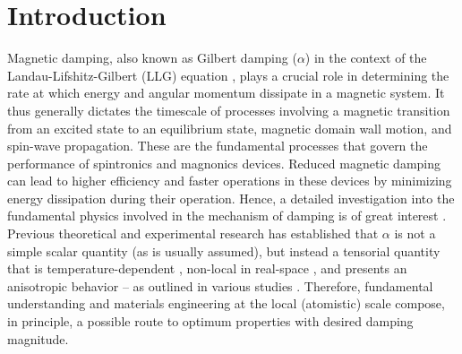 \section{Introduction}

Magnetic damping, also known as Gilbert damping ($\alpha$) in the context of the Landau-Lifshitz-Gilbert (LLG) equation \cite{eriksson2017atomistic}, plays a crucial role in determining the rate at which energy and angular momentum dissipate in a magnetic system. It thus generally dictates the timescale of processes involving a magnetic transition from an excited state to an equilibrium state, magnetic domain wall motion, and spin-wave propagation. These are the fundamental processes that govern the performance of spintronics \cite{chumak2015magnon} and magnonics \cite{barman20212021} devices. Reduced magnetic damping can lead to higher efficiency and faster operations in these devices by minimizing energy dissipation during their operation. Hence, a detailed investigation into the fundamental physics involved in the mechanism of damping is of great interest \cite{schoen2016ultra, jungwirth2016antiferromagnetic, chumak2015magnon, yang2022two}. 
Previous theoretical and experimental research has established that $\alpha$ is not a simple scalar quantity (as is usually assumed), but instead a tensorial quantity \cite{PhysRevB.72.064450, PhysRevB.78.020410, Mondal2018, PhysRevB.98.104406, PhysRevLett.108.057204, PhysRevLett.102.086601} that is temperature-dependent \cite{Zhao2016, PhysRevB.87.014430, Hiramatsu2021}, non-local in real-space \cite{thonig2014gilbert, PhysRevMaterials.2.013801, PhysRevB.72.064450, PhysRevB.78.020410, PhysRevB.105.155151, PhysRevB.108.014433, PhysRevLett.113.237204, Weissenhofer2024, Reyesosorio2023}, and presents an anisotropic behavior -- as outlined in various studies  \cite{PhysRevMaterials.2.013801, PhysRevB.103.L220405, PhysRevLett.122.117203, brinker2022generalization, PhysRevB.104.024404}.
Therefore, fundamental understanding and materials engineering at the local (atomistic) scale compose, in principle, a possible route to optimum properties with desired damping magnitude.

